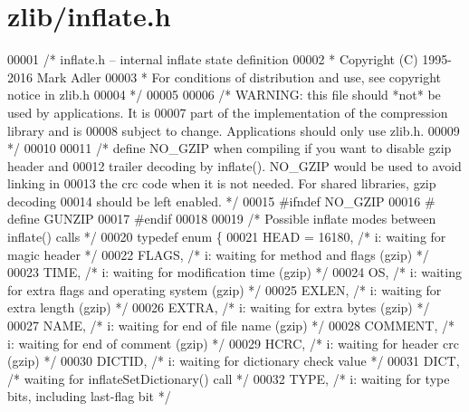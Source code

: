 \hypertarget{zlib_2inflate_8h_source}{}\section{zlib/inflate.h}
\label{zlib_2inflate_8h_source}

\begin{DoxyCode}
00001 \textcolor{comment}{/* inflate.h -- internal inflate state definition}
00002 \textcolor{comment}{ * Copyright (C) 1995-2016 Mark Adler}
00003 \textcolor{comment}{ * For conditions of distribution and use, see copyright notice in zlib.h}
00004 \textcolor{comment}{ */}
00005 
00006 \textcolor{comment}{/* WARNING: this file should *not* be used by applications. It is}
00007 \textcolor{comment}{   part of the implementation of the compression library and is}
00008 \textcolor{comment}{   subject to change. Applications should only use zlib.h.}
00009 \textcolor{comment}{ */}
00010 
00011 \textcolor{comment}{/* define NO\_GZIP when compiling if you want to disable gzip header and}
00012 \textcolor{comment}{   trailer decoding by inflate().  NO\_GZIP would be used to avoid linking in}
00013 \textcolor{comment}{   the crc code when it is not needed.  For shared libraries, gzip decoding}
00014 \textcolor{comment}{   should be left enabled. */}
00015 \textcolor{preprocessor}{#ifndef NO\_GZIP}
00016 \textcolor{preprocessor}{#  define GUNZIP}
00017 \textcolor{preprocessor}{#endif}
00018 
00019 \textcolor{comment}{/* Possible inflate modes between inflate() calls */}
00020 \textcolor{keyword}{typedef} \textcolor{keyword}{enum} \{
00021     HEAD = 16180,   \textcolor{comment}{/* i: waiting for magic header */}
00022     FLAGS,      \textcolor{comment}{/* i: waiting for method and flags (gzip) */}
00023     TIME,       \textcolor{comment}{/* i: waiting for modification time (gzip) */}
00024     OS,         \textcolor{comment}{/* i: waiting for extra flags and operating system (gzip) */}
00025     EXLEN,      \textcolor{comment}{/* i: waiting for extra length (gzip) */}
00026     EXTRA,      \textcolor{comment}{/* i: waiting for extra bytes (gzip) */}
00027     NAME,       \textcolor{comment}{/* i: waiting for end of file name (gzip) */}
00028     COMMENT,    \textcolor{comment}{/* i: waiting for end of comment (gzip) */}
00029     HCRC,       \textcolor{comment}{/* i: waiting for header crc (gzip) */}
00030     DICTID,     \textcolor{comment}{/* i: waiting for dictionary check value */}
00031     DICT,       \textcolor{comment}{/* waiting for inflateSetDictionary() call */}
00032         TYPE,       \textcolor{comment}{/* i: waiting for type bits, including last-flag bit */}

\end{DoxyCode}
